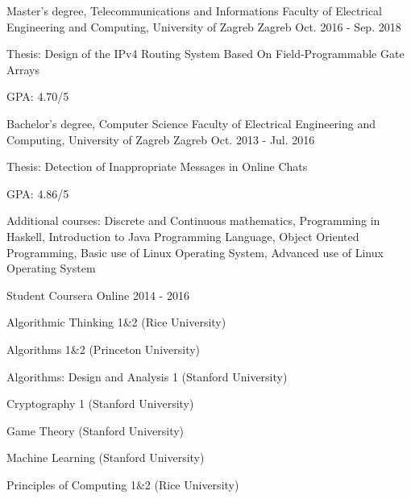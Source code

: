 
\begin{cventries}

  \cventry
    {Master's degree, Telecommunications and Informations} %
    {Faculty of Electrical Engineering and Computing, University of Zagreb} %
    {Zagreb} %
    {Oct. 2016 - Sep. 2018} %
    {
      \begin{cvitems} %
        \item {Thesis: Design of the IPv4 Routing System Based On Field-Programmable Gate Arrays}
        \item {GPA: 4.70/5}
      \end{cvitems}
    }

  \cventry
    {Bachelor's degree, Computer Science} %
    {Faculty of Electrical Engineering and Computing, University of Zagreb} %
    {Zagreb} %
    {Oct. 2013 - Jul. 2016} %
    {
      \begin{cvitems} %
        \item {Thesis: Detection of Inappropriate Messages in Online Chats}
        \item {GPA: 4.86/5}
        \item {Additional courses: Discrete and Continuous mathematics, Programming in Haskell, Introduction to Java Programming Language, Object Oriented Programming, Basic use of Linux Operating System, Advanced use of Linux Operating System}
      \end{cvitems}
    }

  \cventry
    {Student} %
    {Coursera} %
    {Online} %
    {2014 - 2016} %
    {
      \begin{cvitems} %
        \item {Algorithmic Thinking 1\&2 (Rice University)}
        \item {Algorithms 1\&2 (Princeton University)}
        \item {Algorithms: Design and Analysis 1 (Stanford University)}
        \item {Cryptography 1 (Stanford University)}
        \item {Game Theory (Stanford University)}
        \item {Machine Learning (Stanford University)}
        \item {Principles of Computing 1\&2 (Rice University)}
      \end{cvitems}
    }
\end{cventries}
